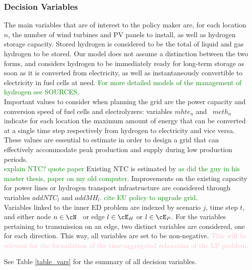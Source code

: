 
\subsubsection{Decision Variables}

The main variables that are of interest to the policy maker are, for each location $n$, the number of wind turbines and PV panels to install, as well as hydrogen storage capacity.
Stored hydrogen is considered to be the total of liquid and gas hydrogen to be stored. Our model does not assume a distinction between the two forms, and considers hydrogen to be immediately ready for long-term storage as soon as it is converted from electricity, as well as instantaneously convertible to electricity in fuel cells at need. \textcolor{Green}{For more detailed models of the management of hydrogen see SOURCES}.\\
\indent Important values to consider when planning the grid are the power capacity and conversion speed of fuel cells and electrolyzers: variables $mhte_n$ and  $meth_n$ indicate for each location the maximum amount of energy that can be converted at a single time step respectively from hydrogen to electricity and vice versa. These values are essential to estimate in order to design a grid that can effectively accommodate peak production and supply during low production periods.\\
\indent \textcolor{Green}{explain NTC? quote paper} Existing NTC is estimated by \textcolor{Green}{as did the guy in his master thesis, paper on my old computer}. Improvements on the existing capacity for power lines or hydrogen transport infrastructure are considered through variables $addNTC_l$ and $addMH_l$. \textcolor{Green}{cite EU policy to upgrade grid}.\\
\indent Variables linked to the inner ED problem are indexed by scenario \(j\), time step \(t\), and either node \(n \in \cN\)  or edge $l\in\cE_H$ or $l \in \cE_P$. For the variables pertaining to transmission on an edge, two distinct variables are considered, one for each direction. This way, all variables are set to be non-negative. \textcolor{pink}{This will be relevant for the formulation of the time-aggregated relaxation of the LP problem.}

See Table \ref{table_vars} for the summary of all decision variables.


